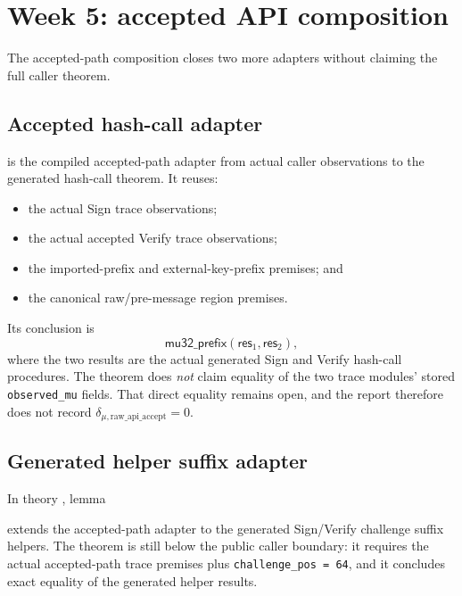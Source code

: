 \section{Week 5: accepted API composition}

The accepted-path composition closes two more adapters without claiming the
full caller theorem.

\subsection{Accepted hash-call adapter}

is the compiled accepted-path adapter from actual caller observations to the
generated hash-call theorem.  It reuses:

\begin{itemize}
  \item the actual Sign trace observations;
  \item the actual accepted Verify trace observations;
  \item the imported-prefix and external-key-prefix premises; and
  \item the canonical raw/pre-message region premises.
\end{itemize}

Its conclusion is
\[
  \mathsf{mu32\_prefix}(\mathsf{res}_1,\mathsf{res}_2),
\]
where the two results are the actual generated Sign and Verify hash-call
procedures.  The theorem does \emph{not} claim equality of the two trace
modules' stored \texttt{observed\_mu} fields.  That direct equality remains
open, and the report therefore does not record
\(\delta_{\mu,\mathrm{raw\_api\_accept}} = 0\).

\subsection{Generated helper suffix adapter}

In theory , lemma
\begin{quote}
\small
{}
\end{quote}
extends the accepted-path adapter to the generated Sign/Verify challenge
suffix helpers.  The theorem is still below the public caller boundary: it
requires the actual accepted-path trace premises plus
\texttt{challenge\_pos = 64}, and it concludes exact equality of the
generated helper results.

